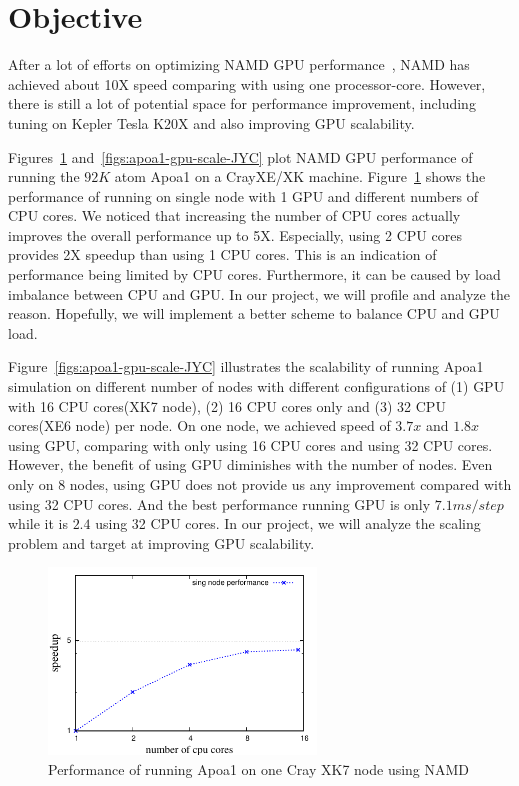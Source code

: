 \documentclass[11pt,onecolumn]{article}
\begin{document}
\section{Objective}
After a lot of efforts on optimizing NAMD GPU performance~\cite{phillips_stone_namd_cuda}, NAMD has achieved 
about 10X speed comparing with using one processor-core. However, there is still a lot of 
potential space for performance improvement, including tuning on Kepler Tesla K20X and
also improving GPU scalability.

Figures~\ref{figs:apoa1-gpu-singlenode-JYC} and~\ref{figs:apoa1-gpu-scale-JYC}
plot NAMD GPU performance of running the $92K$ atom Apoa1 on a CrayXE/XK machine.
Figure~\ref{figs:apoa1-gpu-singlenode-JYC} shows the performance of running on 
single node with 1 GPU and different numbers of CPU cores. We noticed that increasing
the number of CPU cores actually improves the overall performance up to 5X. Especially, 
using 2 CPU cores provides 2X speedup than using 1 CPU cores.
This is an indication of performance being limited by CPU cores. Furthermore, 
it can be caused by load imbalance between CPU and GPU. In our project, we will profile
and analyze the reason. Hopefully, we will implement a better scheme to balance CPU and GPU load.

Figure~\ref{figs:apoa1-gpu-scale-JYC} illustrates the scalability of 
running Apoa1 simulation on different number of nodes with different configurations of 
(1) GPU with 16 CPU cores(XK7 node), (2) 16 CPU cores only and (3) 32 CPU cores(XE6 node) per node.
On one node, we achieved speed of $3.7x$ and $1.8x$ using GPU, comparing with only using 16 CPU cores
and using 32 CPU cores. However, the benefit of using GPU diminishes with the number of nodes.
Even only on 8 nodes, using GPU does not provide us any improvement compared with using 32 CPU cores.
And the best performance running GPU is only $7.1ms/step$ while it is $2.4$ using 32 CPU cores.
In our project, we will analyze the scaling problem and target at improving GPU scalability.


\begin{figure}[h]
\centering
\includegraphics[width=2.8in]{figs/gpu-singlenode}
\caption{Performance of running Apoa1 on one Cray XK7 node using NAMD}
\label{figs:apoa1-gpu-singlenode-JYC}
\vspace{-0.2cm}
\end{figure}
\end{document}
